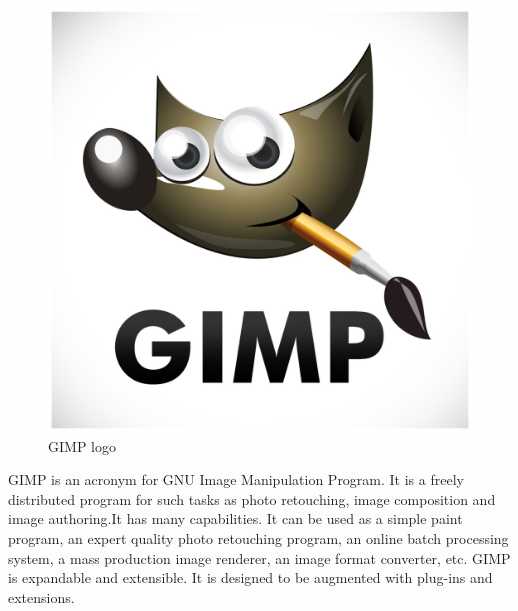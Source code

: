 \begin{figure} [h]
\centering
\includegraphics[scale=0.08]{images/GIMP.jpg}
\caption{GIMP logo}
\end{figure}
GIMP is an acronym for GNU Image Manipulation Program. It is a freely distributed program for such tasks as photo retouching, image composition and image authoring.It has many capabilities. It can be used as a simple paint program, an expert quality photo retouching program, an online batch processing system, a mass production image renderer, an image format converter, etc. GIMP is expandable and extensible. It is designed to be augmented with plug-ins and extensions.\\

